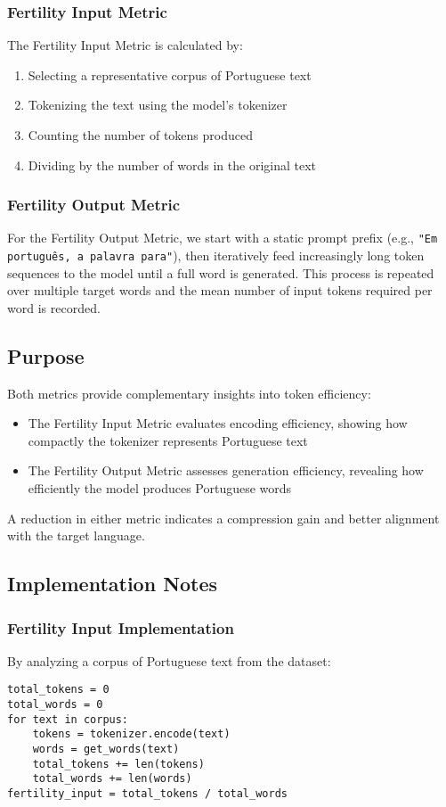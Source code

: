\subsubsection{Fertility Input Metric}
The Fertility Input Metric is calculated by:
\begin{enumerate}
    \item Selecting a representative corpus of Portuguese text
    \item Tokenizing the text using the model's tokenizer
    \item Counting the number of tokens produced
    \item Dividing by the number of words in the original text
\end{enumerate}

\subsubsection{Fertility Output Metric}
For the Fertility Output Metric, we start with a static prompt prefix (e.g., \texttt{"Em português, a palavra para"}), then iteratively feed increasingly long token sequences to the model until a full word is generated. This process is repeated over multiple target words and the mean number of input tokens required per word is recorded.

\subsection{Purpose}
Both metrics provide complementary insights into token efficiency:
\begin{itemize}
    \item The Fertility Input Metric evaluates encoding efficiency, showing how compactly the tokenizer represents Portuguese text
    \item The Fertility Output Metric assesses generation efficiency, revealing how efficiently the model produces Portuguese words
\end{itemize}

A reduction in either metric indicates a compression gain and better alignment with the target language.

\subsection{Implementation Notes}
\subsubsection{Fertility Input Implementation}
By analyzing a corpus of Portuguese text from the \cite{calamept_reference} dataset:
\begin{lstlisting}
total_tokens = 0
total_words = 0
for text in corpus:
    tokens = tokenizer.encode(text)
    words = get_words(text)
    total_tokens += len(tokens)
    total_words += len(words)
fertility_input = total_tokens / total_words
\end{lstlisting}

